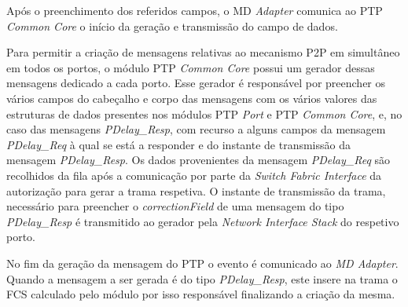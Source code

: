 Após o preenchimento dos referidos campos, o MD \textit{Adapter} comunica ao PTP \textit{Common Core} o início da geração e transmissão do campo de dados.\par Para permitir a criação de mensagens relativas ao mecanismo P2P em simultâneo em todos os portos, o módulo PTP \textit{Common Core} possui um gerador dessas mensagens dedicado a cada porto. Esse gerador é responsável por preencher os vários campos do cabeçalho e corpo das mensagens com os vários valores das estruturas de dados presentes nos módulos PTP \textit{Port} e PTP \textit{Common Core}, e, no caso das mensagens \textit{PDelay\_Resp}, com recurso a alguns campos da mensagem \textit{PDelay\_Req} à qual se está a responder e do instante de transmissão da mensagem \textit{PDelay\_Resp}. Os dados provenientes da mensagem \textit{PDelay\_Req} são recolhidos da fila após a comunicação por parte da \textit{Switch Fabric Interface} da autorização para gerar a trama respetiva. O instante de transmissão da trama, necessário para preencher o \textit{correctionField} de uma mensagem do tipo \textit{PDelay\_Resp} é transmitido ao gerador pela \textit{Network Interface Stack} do respetivo porto.\par     
No fim da geração da mensagem do PTP o evento é comunicado ao \textit{MD Adapter}. Quando a mensagem a ser gerada é do tipo \textit{PDelay\_Resp}, este insere na trama o FCS calculado pelo módulo por isso responsável finalizando a criação da mesma.

